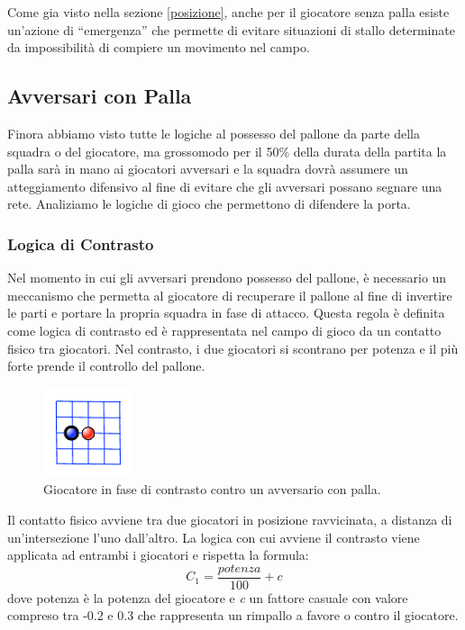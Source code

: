 \documentclass[aps,letterpaper,10pt]{article}
\begin{document}
Come gia visto nella sezione \ref{posizione}, anche per il giocatore senza palla esiste un'azione di ``emergenza'' che
permette di evitare situazioni di stallo determinate da impossibilit\`a di compiere un movimento nel campo.

\subsection{Avversari con Palla}

Finora abbiamo visto tutte le logiche al possesso del pallone da parte della squadra o del giocatore, ma grossomodo per
il 50\% della durata della partita la palla sar\`a in mano ai giocatori avversari e la squadra dovr\`a assumere un
atteggiamento difensivo al fine di evitare che gli avversari possano segnare una rete. Analiziamo le logiche di gioco
che permettono di difendere la porta.

\subsubsection{Logica di Contrasto}
\label{scontro}

Nel momento in cui gli avversari prendono possesso del pallone, \`e necessario un meccanismo che permetta al giocatore
di recuperare il pallone al fine di invertire le parti e portare la propria squadra in fase di attacco. Questa regola
\`e definita come logica di contrasto ed \`e rappresentata nel campo di gioco da un contatto fisico tra giocatori. Nel
contrasto, i due giocatori si scontrano per potenza e il pi\`u forte prende il controllo del pallone. \vspace{3mm}

\begin{figure}[H]
	\begin{center}
		\includegraphics[width=100px]{images/contrast.pdf}
	\end{center}
\caption{Giocatore in fase di contrasto contro un avversario con palla.}
\end{figure}

Il contatto fisico avviene tra due giocatori in posizione ravvicinata, a distanza di un'intersezione l'uno dall'altro.
La logica con cui avviene il contrasto viene applicata ad entrambi i giocatori e rispetta la formula: $$ C_1 =
\frac{potenza}{100} + c $$ dove potenza \`e la potenza del giocatore e \emph{c} un fattore casuale con valore compreso
tra -0.2 e 0.3 che rappresenta un rimpallo a favore o contro il giocatore. \vspace{3mm}
\end{document}
